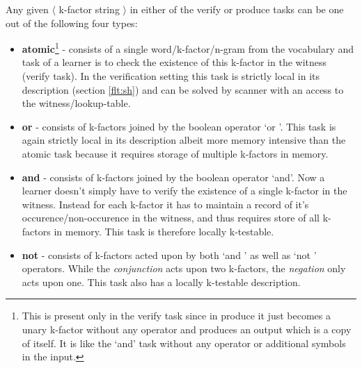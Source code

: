 Any given $\langle$ k-factor string $\rangle$ in either of the verify or produce tasks can be one out of the following four types:
\begin{itemize}
	\item \textbf{atomic}\footnote{This is present only in the verify task since in produce it just becomes a unary k-factor without any operator and produces an output which is a copy of itself. It is like the \lq and\rq{} task without any operator or additional symbols in the input.} - consists of a single word/k-factor/n-gram from the vocabulary and task of a learner is to check the existence of this k-factor in the witness (verify task). In the verification setting this task is strictly local in its description (section \ref{flt:sh}) and can be solved by scanner with an access to the witness/lookup-table.
	\item \textbf{or} - consists of k-factors joined by the boolean operator \lq or \rq{}. This task is again strictly local in its description albeit more memory intensive than the atomic task because it requires storage of multiple k-factors in memory.
	\item \textbf{and} - consists of k-factors joined by the boolean operator \lq and\rq{}. Now a learner doesn't simply have to verify the existence of a single k-factor in the witness. Instead for each k-factor it has to maintain a record of it's occurence/non-occurence in the witness, and thus requires store of all k-factors in memory. This task is therefore locally k-testable. 
	\item \textbf{not} - consists of k-factors acted upon by both \lq and \rq{} as well as \lq not \rq{} operators. While the \textit{conjunction} acts upon two k-factors, the \textit{negation} only acts upon one. This task also has a locally k-testable description. 
\end{itemize}



